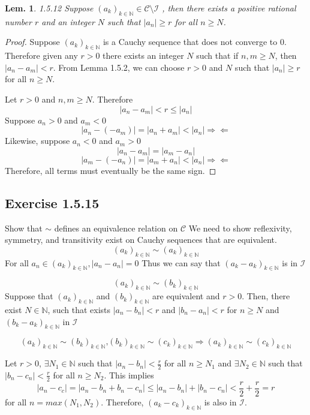\documentclass{tufte-book}
\theoremstyle{mytheoremstyle}
\theoremstyle{mylemstyle}
\newtheorem*{lem}{Lem.}
\theoremstyle{mydefstyle}
\begin{document}
\begin{lem}{1.5.12} Suppose $(a_k)_{k  \in \mathbb{N}} \in \mathcal{C} \setminus \mathcal{I}$  , then there exists a positive rational number $r$ and an integer $N$ such that $|a_n| \geq r$ for all $n \geq N$.
\end{lem}
\begin{proof} Suppose $(a_k)_{k \in \mathbb{N}}$ is a Cauchy sequence that does not converge to $0$. Therefore given any $r>0$ there exists an integer $N$ such that if $n,m \geq N$, then $|a_n - a_m| < r$.   From Lemma 1.5.2, we can choose $r >0$ and $N$ such that $|a_n| \geq r$ for all $n \geq N$. 

Let $r > 0$ and $n,m \geq N$. Therefore
\[|a_n - a_m| < r \leq |a_n|\] 
Suppose  $a_n > 0$ and $a_m < 0$
\[|a_n-(-a_m)| = |a_n + a_m| < |a_n|  \Rightarrow \Leftarrow \]  
Likewise, suppose $a_n < 0$ and $a_m > 0$
\[|a_n-a_m| = |a_m-a_n|\]
\[|a_m - (-a_n)| = |a_m+a_n| < |a_n|  \Rightarrow \Leftarrow \]
Therefore, all terms must eventually be the same sign.

\end{proof}


\subsection{Exercise 1.5.15}
Show that $\sim$ defines an equivalence relation on $\mathcal{C}$
We need to show reflexivity, symmetry, and transitivity exist on Cauchy sequences that are equivalent.
\[(a_k)_{k \in \mathbb{N}} \sim (a_k)_{k \in \mathbb{N}}\]
For all $a_n \in (a_k)_{k \in \mathbb{N}}, |a_n-a_n| = 0$ Thus we can say that $(a_k-a_k)_{k \in \mathbb{N}}$ is in $\mathcal{I}$

\[(a_k)_{k \in \mathbb{N}} \sim (b_k)_{k \in \mathbb{N}}\]
Suppose that $(a_k)_{k \in \mathbb{N}}$ and $(b_k)_{k \in \mathbb{N}}$ are equivalent and $r > 0$. Then, there exist $N \in \mathbb{N}$, such that exists $|a_n-b_n|<r$ and $|b_n-a_n|<r$ for $n \geq N$ and $(b_k - a_k)_{k \in \mathbb{N}}$ in $\mathcal{I}$

\[(a_k)_{k \in \mathbb{N}} \sim (b_k)_{k \in \mathbb{N}} \text{,} (b_k)_{k \in \mathbb{N}} \sim (c_k)_{k \in \mathbb{N}} \Rightarrow (a_k)_{k \in \mathbb{N}} \sim (c_k)_{k \in \mathbb{N}}\]

Let $r>0$, $\exists N_1 \in \mathbb{N}$ such that $|a_n - b_n| < \frac{r}{2}$ for all $n \geq N_1$ and $\exists N_2 \in \mathbb{N}$ such that $|b_n - c_n| < \frac{r}{2}$ for all $n \geq N_2$.  This implies 
\[ |a_n - c_c| = |a_n - b_n + b_n-c_n| \leq |a_n - b_n| + |b_n - c_n| < \frac{r}{2} + \frac{r}{2} = r \]
for all $n = max(N_1,N_2)$.  Therefore, $(a_k - c_k)_{k \in \mathbb{N}}$ is also in $\mathcal{I}$.
\end{document}
